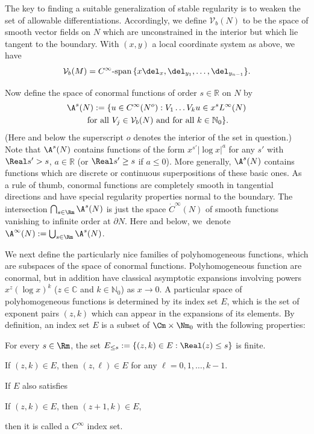 The key to finding a suitable generalization of stable regularity is to weaken the set of allowable differentiations. Accordingly, we define $\mathcal V_b(N)$ to be the space of smooth vector fields on $N$ which are unconstrained in the interior but which lie tangent to the boundary. With $(x, y)$ a local coordinate system as above, we have\vspace*{-3pt}
\begin{equation}
\mathcal V_b(M) = C^\infty\text{-}\mathrm{span}\, \{ x\del_x, \del_{y_1}, \ldots, \del_{y_{n-1}} \}.
\label{Vb}
\end{equation}

Now define the space of conormal functions of order $s \in \mathbb R$ on $N$ by\vspace*{-5pt}
\begin{multline*}
\A^s (N) := \{u\in C^\infty(N^{o}): V_1 \ldots V_k u \in x^s L^\infty(N) \\
\text{ for all } V_j \in \mathcal V_b(N)\ \mbox{and for all}\ k \in \mathbb N_0\}.
\end{multline*}
(Here and below the superscript $o$ denotes the interior of the set in question.) Note that $\A^s(N)$ contains functions of the form $x^{s'}|{\log x}|^a$ for any $s'$ with $\Real s' > s$, $a \in \mathbb R$ (or $\Real s' \geq s$ if $a \leq 0$). More generally, $\A^s(N)$ contains functions which are discrete or continuous superpositions of these basic ones. As a rule of thumb, conormal functions are completely smooth in tangential directions and have special regularity properties normal to the boundary. The intersection $\bigcap_{s\in \Rm} \A^s (N)$ is just the space $\dot{C}^\infty (N)$ of smooth functions vanishing to infinite order at $\partial N$. Here and below, we~denote $\A^\infty(N) := \bigcup_{s\in \Rm} \A^s(N)$.

We next define the particularly nice families of polyhomogeneous functions, which are subspaces of the space of conormal functions.
Polyhomogeneous function are conormal, but in addition have classical asymptotic expansions involving
powers $x^z (\log x)^k$ ($z \in \mathbb C$ and $k \in \mathbb N_0$) as $x \to 0$. A particular space of polyhomogeneous
functions is determined by its index set $E$, which is the set of exponent pairs $(z,k)$ which
can appear in the expansions of its elements. By definition, an index set $E$ is a subset of $\Cm\times \Nm_0$ with the following properties:

\begin{enumeratea}
\item\label{cond:a}
For every $s\in \Rm$, the set $E_{\le s} := \{(z,k)\in E : \Real (z)\le s\}$ is finite.
\item\label{cond:b}
If $(z,k)\in E$, then $(z,\ell)\in E$ for any $\ell = 0,1,\dots,k-1$.
\end{enumeratea}
\noindent
If $E$ also satisfies
\begin{enumeratea}\setcounter{enumi}{2}
\item\label{cond:c}
If $(z,k)\in E$, then $(z+1,k)\in E$,
\end{enumeratea}
\noindent
then it is called a $C^\infty$ index set.

